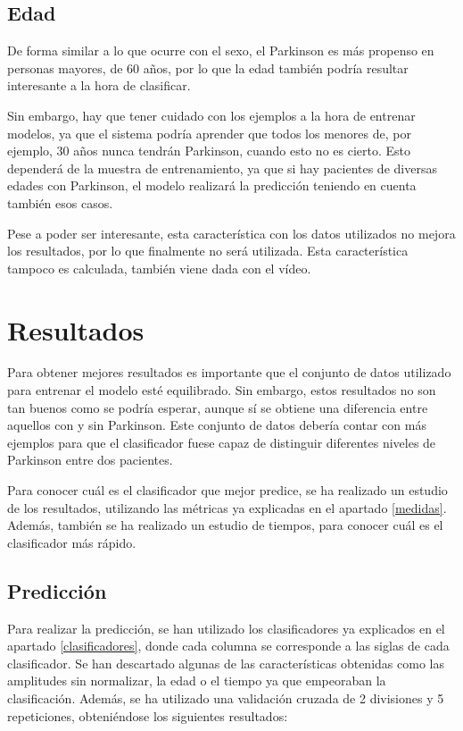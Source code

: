 \subsection{Edad}
De forma similar a lo que ocurre con el sexo, el Parkinson es más propenso en personas mayores, de 60 años, por lo que la edad también podría resultar interesante a la hora de clasificar.

Sin embargo, hay que tener cuidado con los ejemplos a la hora de entrenar modelos, ya que el sistema podría aprender que todos los menores de, por ejemplo, 30 años nunca tendrán Parkinson, cuando esto no es cierto. Esto dependerá de la muestra de entrenamiento, ya que si hay pacientes de diversas edades con Parkinson, el modelo realizará la predicción teniendo en cuenta también esos casos. 

Pese a poder ser interesante, esta característica con los datos utilizados no mejora los resultados, por lo que finalmente no será utilizada. Esta característica tampoco es calculada, también viene dada con el vídeo.

\section{Resultados} \label{resultados}
Para obtener mejores resultados es importante que el conjunto de datos utilizado para entrenar el modelo esté equilibrado. Sin embargo, estos resultados no son tan buenos como se podría esperar, aunque sí se obtiene una diferencia entre aquellos con y sin Parkinson. Este conjunto de datos debería contar con más ejemplos para que el clasificador fuese capaz de distinguir diferentes niveles de Parkinson entre dos pacientes.

Para conocer cuál es el clasificador que mejor predice, se ha realizado un estudio de los resultados, utilizando las métricas ya explicadas en el apartado \ref{medidas}. Además, también se ha realizado un estudio de tiempos, para conocer cuál es el clasificador más rápido.

\subsection{Predicción}
Para realizar la predicción, se han utilizado los clasificadores ya explicados en el apartado \ref{clasificadores}, donde cada columna se corresponde a las siglas de cada clasificador. Se han descartado algunas de las características obtenidas como las amplitudes sin normalizar, la edad o el tiempo ya que empeoraban la clasificación. Además, se ha utilizado una validación cruzada de 2 divisiones y 5 repeticiones, obteniéndose los siguientes resultados:

